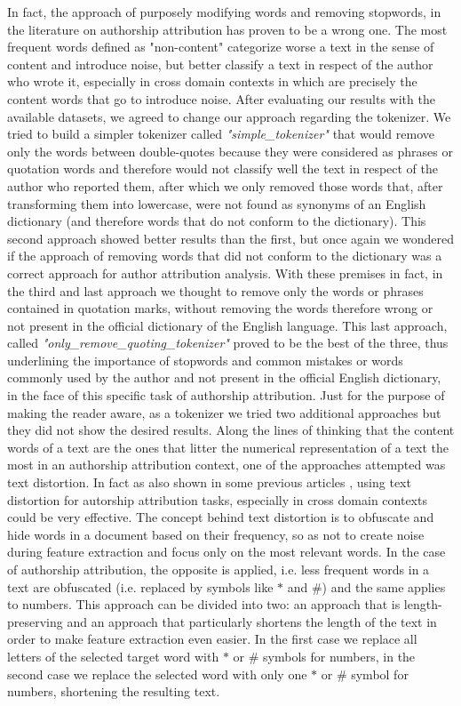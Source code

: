 In fact, the approach of purposely modifying words and removing stopwords, in the literature on authorship attribution has proven to be a wrong one. The most frequent words defined as "non-content" categorize worse a text in the sense of content and introduce noise, but better classify a text in respect of the author who wrote it, especially in cross domain contexts in which are precisely the content words that go to introduce noise.
After evaluating our results with the available datasets, we agreed to change our approach regarding the tokenizer. We tried to build a simpler tokenizer called \textit{"simple\_tokenizer"} that would remove only the words between double-quotes because they were considered as phrases or quotation words and therefore would not classify well the text in respect of the author who reported them, after which we only removed those words that, after transforming them into lowercase, were not found as synonyms of an English dictionary (and therefore words that do not conform to the dictionary). This second approach showed better results than the first, but once again we wondered if the approach of removing words that did not conform to the dictionary was a correct approach for author attribution analysis. With these premises in fact, in the third and last approach we thought to remove only the words or phrases contained in quotation marks, without removing the words therefore wrong or not present in the official dictionary of the English language. This last approach, called \textit{"only\_remove\_quoting\_tokenizer"} proved to be the best of the three, thus underlining the importance of stopwords and common mistakes or words commonly used by the author and not present in the official English dictionary, in the face of this specific task of authorship attribution.
Just for the purpose of making the reader aware, as a tokenizer we tried two additional approaches but they did not show the desired results.  Along the lines of thinking that the content words of a text are the ones that litter the numerical representation of a text the most in an authorship attribution context, one of the approaches attempted was text distortion. In fact as also shown in some previous articles \cite{stamatatos2017authorship}, using text distortion for autorship attribution tasks, especially in cross domain contexts could be very effective. The concept behind text distortion is to obfuscate and hide words in a document based on their frequency, so as not to create noise during feature extraction and focus only on the most relevant words. In the case of authorship attribution, the opposite is applied, i.e. less frequent words in a text are obfuscated (i.e. replaced by symbols like $ * $ and $ \# $) and the same applies to numbers. This approach can be divided into two: an approach that is length-preserving and an approach that particularly shortens the length of the text in order to make feature extraction even easier. In the first case we replace all letters of the selected target word with $ * $ or $ \# $ symbols for numbers, in the second case we replace the selected word with only one $ * $ or $ \# $ symbol for numbers, shortening the resulting text.
